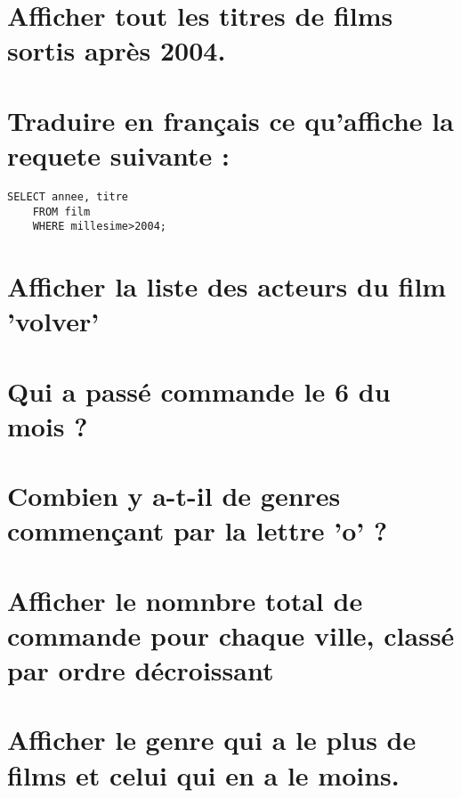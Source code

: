 \documentclass[]{scrartcl}
\title{}
\author{}
\begin{document}
\lstset{language=sql}   

\section{Afficher tout les titres de films sortis après 2004.}
	

\section{Traduire en français ce qu'affiche la requete suivante :}

\begin{lstlisting}[frame=single]  
	SELECT annee, titre 
	FROM film
	WHERE millesime>2004;
\end{lstlisting}

\section{Afficher la liste des acteurs du film 'volver'}

\section{Qui a passé commande le 6 du mois ?}

\section{Combien y a-t-il de genres commençant par la lettre 'o' ?}

\section{Afficher le nomnbre total de commande pour chaque ville, classé par ordre décroissant}

\section{Afficher le genre qui a le plus de films et celui qui en a le moins.}
\end{document}
